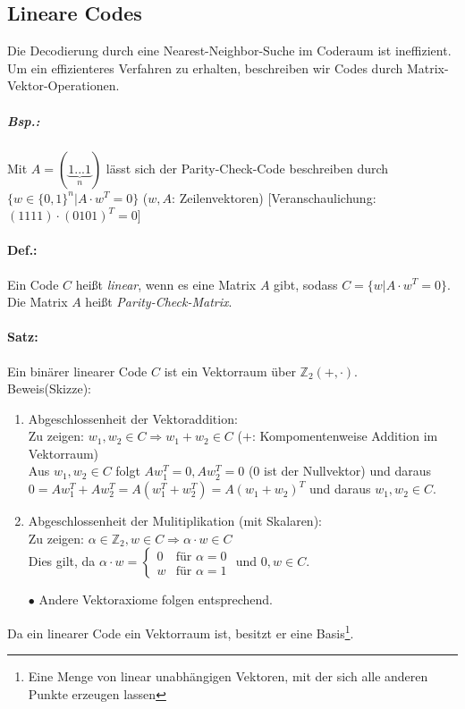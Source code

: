 \documentclass{scrreprt}
\begin{document}
\subsection{Lineare Codes}
Die Decodierung durch eine Nearest-Neighbor-Suche im Coderaum ist ineffizient. Um ein effizienteres Verfahren zu erhalten, beschreiben wir Codes durch Matrix-Vektor-Operationen.
\subparagraph{Bsp.:} Mit $A = (\underbrace{1 ... 1}_{n})$ lässt sich der Parity-Check-Code beschreiben durch $\{w\in \{0,1\}^n| A\cdot w^T=0\}$ ($w,A$: Zeilenvektoren) [Veranschaulichung: $(1111)\cdot(0101)^T=0$]

\paragraph{Def.:} Ein Code $C$ heißt \emph{linear}, wenn es eine Matrix $A$ gibt, sodass $C=\{w|A\cdot w^T=0\}$.\\
Die Matrix $A$ heißt \emph{Parity-Check-Matrix}.

\paragraph{Satz:} Ein binärer linearer Code $C$ ist ein Vektorraum über $\mathbb{Z}_2(+,\cdot)$.\\
Beweis(Skizze):
\begin{enumerate}
\item Abgeschlossenheit der Vektoraddition:\\
Zu zeigen: $w_1,w_2\in C \Rightarrow w_1+w_2 \in C$ ($+$: Kompomentenweise Addition im Vektorraum)\\
Aus $w_1,w_2\in C$ folgt $Aw_1^T=0, Aw_2^T=0$ ($0$ ist der Nullvektor) und daraus $0=Aw_1^T+Aw_2^T=A(w_1^T+w_2^T)=A(w_1+w_2)^T$ und daraus $w_1,w_2 \in C$.
\item Abgeschlossenheit der Mulitiplikation (mit Skalaren):\\
Zu zeigen: $\alpha \in \mathbb{Z}_2, w \in C \Rightarrow \alpha \cdot w \in C$\\
Dies gilt, da $\alpha\cdot w =\begin{cases}
0 & \text{für }\alpha =0\\
w & \text{für } \alpha =1
\end{cases}$ und $0,w \in C$.
\item[$\bullet$] Andere Vektoraxiome folgen entsprechend.
\end{enumerate}
Da ein linearer Code ein Vektorraum ist, besitzt er eine Basis\footnote{Eine Menge von linear unabhängigen Vektoren, mit der sich alle anderen Punkte erzeugen lassen}.
\end{document}
